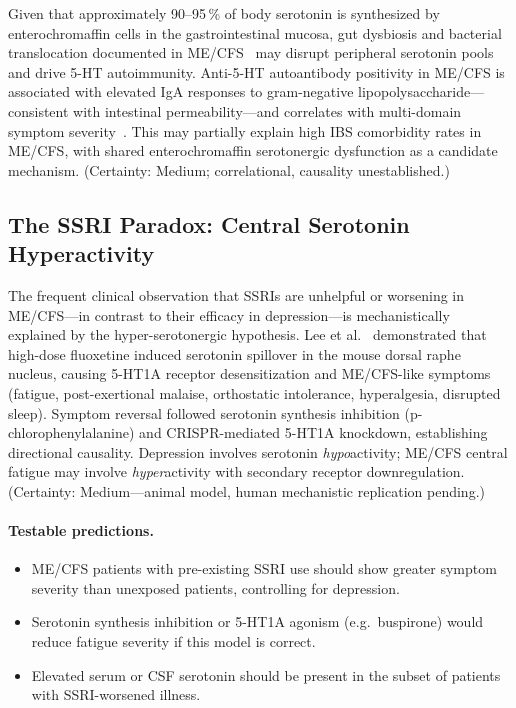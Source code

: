\begin{hypothesis}
\label{hyp:ch15-gut-serotonin}
Given that approximately 90--95\,\% of body serotonin is synthesized by enterochromaffin cells in the gastrointestinal mucosa, gut dysbiosis and bacterial translocation documented in ME/CFS~\cite{Maes2013serotonin} may disrupt peripheral serotonin pools and drive 5-HT autoimmunity. Anti-5-HT autoantibody positivity in ME/CFS is associated with elevated IgA responses to gram-negative lipopolysaccharide---consistent with intestinal permeability---and correlates with multi-domain symptom severity~\cite{Maes2013serotonin}. This may partially explain high IBS comorbidity rates in ME/CFS, with shared enterochromaffin serotonergic dysfunction as a candidate mechanism. (Certainty: Medium; correlational, causality unestablished.)
\end{hypothesis}

\subsection{The SSRI Paradox: Central Serotonin Hyperactivity}

\begin{hypothesis}
\label{hyp:ch15-ssri-paradox}
The frequent clinical observation that SSRIs are unhelpful or worsening in ME/CFS---in contrast to their efficacy in depression---is mechanistically explained by the hyper-serotonergic hypothesis. Lee et al.~\cite{Lee2024serotonin} demonstrated that high-dose fluoxetine induced serotonin spillover in the mouse dorsal raphe nucleus, causing 5-HT1A receptor desensitization and ME/CFS-like symptoms (fatigue, post-exertional malaise, orthostatic intolerance, hyperalgesia, disrupted sleep). Symptom reversal followed serotonin synthesis inhibition (p-chlorophenylalanine) and CRISPR-mediated 5-HT1A knockdown, establishing directional causality. Depression involves serotonin \emph{hypo}activity; ME/CFS central fatigue may involve \emph{hyper}activity with secondary receptor downregulation. (Certainty: Medium---animal model, human mechanistic replication pending.)

\paragraph{Testable predictions.}
\begin{itemize}
  \item ME/CFS patients with pre-existing SSRI use should show greater symptom severity than unexposed patients, controlling for depression.
  \item Serotonin synthesis inhibition or 5-HT1A agonism (e.g.~buspirone) would reduce fatigue severity if this model is correct.
  \item Elevated serum or CSF serotonin should be present in the subset of patients with SSRI-worsened illness.
\end{itemize}
\end{hypothesis}

